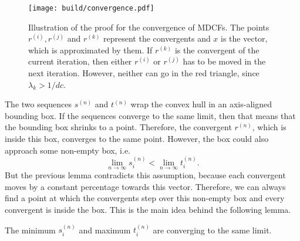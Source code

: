 \begin{figure}[tbp]
  \centering
  \texttt{[image: build/convergence.pdf]}
  \caption{
    Illustration of the proof for the convergence of MDCFs.
    The points $r^{(i)}, r^{(j)}$ and $r^{(k)}$ represent the convergents and $x$ is
    the vector, which is approximated by them.
    If $r^{(k)}$ is the convergent of the current iteration,
    then either $r^{(i)}$ or $r^{(j)}$ has to be moved in the next iteration.
    However, neither can go in the red triangle,
    since $λ_k > 1/dc$.
  }
  \label{fig:convergence}
\end{figure}

The two sequences $s^{(n)}$ and $t^{(n)}$ wrap the convex hull in an
axis-aligned bounding box.
If the sequences converge to the same limit,
then that means that the bounding box shrinks to a point.
Therefore, the convergent $r^{(n)}$, which is inside this box, converges to the
same point.
However, the box could also approach some non-empty box, i.e.
\[
  \lim_{n → ∞} s_i^{(n)} < \lim_{n → ∞} t_i^{(n)}.
\]
But the previous lemma contradicts this assumption,
because each convergent moves by a constant percentage towards this vector.
Therefore, we can always find a point at which the convergents step over this
non-empty box and every convergent is inside the box.
This is the main idea behind the following lemma.

\begin{lemma}
  \label{lem:min-max-conv}
  The minimum $s_i^{(n)}$ and maximum $t_i^{(n)}$ are converging to the same
  limit.
\end{lemma}

